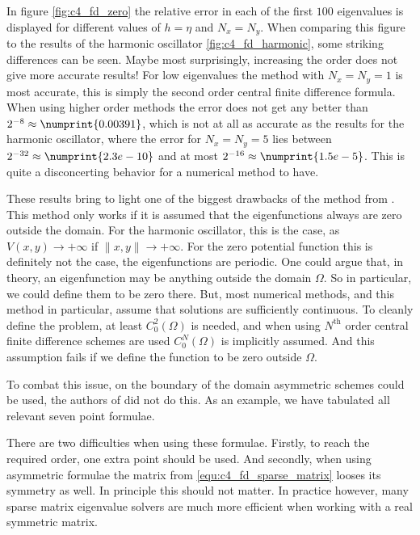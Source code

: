In figure \ref{fig:c4_fd_zero} the relative error in each of the first $100$ eigenvalues is displayed for different values of $h = \eta$ and $N_x = N_y$. When comparing this figure to the results of the harmonic oscillator \ref{fig:c4_fd_harmonic}, some striking differences can be seen. Maybe most surprisingly, increasing the order does not give more accurate results! For low eigenvalues the method with $N_x=N_y=1$ is most accurate, this is simply the second order central finite difference formula. When using higher order methods the error does not get any better than $2^{-8}\approx \numprint{0.00391}$, which is not at all as accurate as the results for the harmonic oscillator, where the error for $N_x=N_y = 5$ lies between $2^{-32} \approx \numprint{2.3e-10}$ and at most $2^{-16} \approx \numprint{1.5e-5}$. This is quite a disconcerting behavior for a numerical method to have.

These results bring to light one of the biggest drawbacks of the method from \cite{wang_new_2009}. This method only works if it is assumed that the eigenfunctions always are zero outside the domain. For the harmonic oscillator, this is the case, as $V(x, y) \to +\infty$ if $\|x, y\| \to +\infty$. For the zero potential function this is definitely not the case, the eigenfunctions are periodic. One could argue that, in theory, an eigenfunction may be anything outside the domain $\Omega$. So in particular, we could define them to be zero there. But, most numerical methods, and this method in particular, assume that solutions are sufficiently continuous. To cleanly define the problem, at least $C_0^2(\Omega)$ is needed, and when using $N^\text{th}$ order central finite difference schemes are used $C_0^{N}(\Omega)$ is implicitly assumed. And this assumption fails if we define the function to be zero outside $\Omega$.

To combat this issue, on the boundary of the domain asymmetric schemes could be used, the authors of \cite{wang_new_2009} did not do this. As an example, we have tabulated all relevant seven point formulae.
\begin{center}
    
\end{center}
There are two difficulties when using these formulae. Firstly, to reach the required order, one extra point should be used. And secondly, when using asymmetric formulae the matrix from \eqref{equ:c4_fd_sparse_matrix} looses its symmetry as well. In principle this should not matter. In practice however, many sparse matrix eigenvalue solvers are much more efficient when working with a real symmetric matrix.

